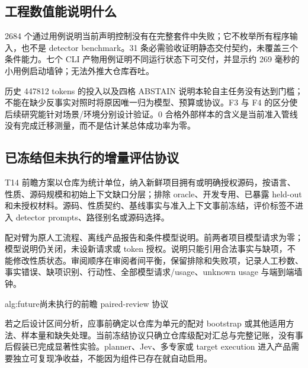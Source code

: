 \subsection{工程数值能说明什么}
2684 个通过用例说明当前声明控制没有在完整套件中失败；它不枚举所有程序输入，也不是 detector benchmark。31 条必需验收证明静态交付契约，未覆盖三个条件能力。七个 CLI 产物用例证明不同运行状态下可交付，并显示约 269 毫秒的小用例启动墙钟；无法外推大仓库吞吐。

历史 447812 tokens 的投入以及四格 ABSTAIN 说明本轮自主任务没有达到门槛；不能在缺少反事实对照时将原因唯一归为模型、预算或协议。F3 与 F4 的区分使后续研究能针对场景/环境分别设计验证。0 合格外部样本的含义是当前准入管线没有完成迁移测量，而不是估计某总体成功率为零。

\subsection{已冻结但未执行的增量评估协议}
T14 前瞻方案以仓库为统计单位，纳入新鲜项目拥有或明确授权源码，按语言、性质、源码规模和初始上下文缺口分层；排除 oracle、开发专用、已暴露 held-out 和未授权材料。源码、性质契约、基线事实与准入上下文事前冻结，评价标签不进入 detector prompts、路径别名或源码选择。\citep{increment}

配对臂为原人工流程、离线产品报告和条件模型说明。前两者项目模型请求为零；模型说明仍关闭，未设新请求或 token 授权。说明只能引用合法事实与缺项，不能修改性质状态。审阅顺序在审阅者间平衡，保留排除和失败项，记录人工秒数、事实错误、缺项识别、行动性、全部模型请求/usage、unknown usage 与端到端墙钟。

\begin{pseudocode}{alg:future}{尚未执行的前瞻 paired-review 协议}
\end{pseudocode}

若之后设计区间分析，应事前确定以仓库为单元的配对 bootstrap 或其他适用方法、样本量和缺失处理。当前冻结协议只确立仓库级配对汇总与完整记账，没有事后假装已完成显著性实验。planner、Jev、多专家或 target execution 进入产品需要独立可复现净收益，不能因为组件已存在就自动启用。

